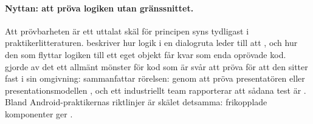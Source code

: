 \paragraph{Nyttan: att pröva logiken utan gränssnittet.}  Att
prövbarheten är ett uttalat skäl för principen syns tydligast i
praktikerlitteraturen.  \Textcite{Feathers2002Humble} beskriver hur
logik i en dialogruta leder till att
, och hur den som
flyttar logiken till ett eget objekt får kvar
 som enda oprövade
kod.  \Textcite{Meszaros2007Humble} gjorde av det ett allmänt mönster
för kod som är svår att pröva för att den sitter fast i sin omgivning:
\Textcite{Fowler2006GUIArchitectures} sammanfattar rörelsen: genom att
pröva presentatören eller presentationsmodellen
, och ett
industriellt team rapporterar att sådana test är
.  Bland Android-praktikernas riktlinjer är
skälet detsamma: frikopplade komponenter ger
.

